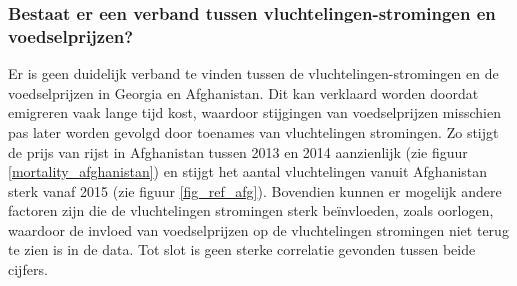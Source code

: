 \documentclass{article}
\begin{document}
\subsubsection*{Bestaat er een verband tussen vluchtelingen-stromingen en voedselprijzen?}
Er is geen duidelijk verband te vinden tussen de vluchtelingen-stromingen en de voedselprijzen in Georgia en Afghanistan. 
Dit kan verklaard worden doordat emigreren vaak lange tijd kost, waardoor stijgingen van voedselprijzen misschien pas later worden gevolgd door toenames van vluchtelingen stromingen. Zo stijgt de prijs van rijst in Afghanistan tussen 2013 en 2014 aanzienlijk (zie figuur \ref{mortality_afghanistan}) en stijgt het aantal vluchtelingen vanuit Afghanistan sterk vanaf 2015 (zie figuur \ref{fig_ref_afg}). Bovendien kunnen er mogelijk andere factoren zijn die de vluchtelingen stromingen sterk beïnvloeden, zoals oorlogen, waardoor de invloed van voedselprijzen op de vluchtelingen stromingen niet terug te zien is in de data. Tot slot is geen sterke correlatie gevonden tussen beide cijfers.



\newpage

\printbibliography
\end{document}
